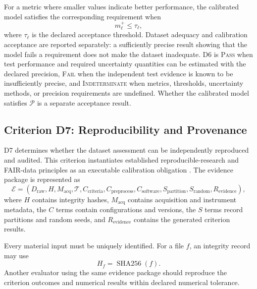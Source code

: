 \documentclass[11pt,a4paper]{article}
\begin{document}
For a metric where smaller values indicate better performance, the calibrated
model satisfies the corresponding requirement when
\begin{equation}
    m_\ell^{+}
    \leq
    \tau_\ell,
\end{equation}
where $\tau_\ell$ is the declared acceptance threshold. Dataset adequacy and
calibration acceptance are reported separately: a sufficiently precise result
showing that the model fails a requirement does not make the dataset
inadequate. D6 is \textsc{Pass} when test performance and required uncertainty
quantities can be estimated with the declared precision, \textsc{Fail} when
the independent test evidence is known to be insufficiently precise, and
\textsc{Indeterminate} when metrics, thresholds, uncertainty methods, or
precision requirements are undefined. Whether the calibrated model satisfies
$\mathcal{P}$ is a separate acceptance result.

\subsection{Criterion D7: Reproducibility and Provenance}

D7 determines whether the dataset assessment can be independently reproduced
and audited. This criterion instantiates established reproducible-research and
FAIR-data principles as an executable calibration obligation
\cite{sandve2013,wilkinson2016}. The evidence package is represented as
\begin{equation}
    \mathcal{E}
    =
    \left(
        D_{\mathrm{raw}},
        H,
        M_{\mathrm{acq}},
        \mathcal{T},
        C_{\mathrm{criteria}},
        C_{\mathrm{preprocess}},
        C_{\mathrm{software}},
        S_{\mathrm{partition}},
        S_{\mathrm{random}},
        R_{\mathrm{evidence}}
    \right),
\end{equation}
where $H$ contains integrity hashes, $M_{\mathrm{acq}}$ contains acquisition
and instrument metadata, the $C$ terms contain configurations and versions,
the $S$ terms record partitions and random seeds, and
$R_{\mathrm{evidence}}$ contains the generated criterion results.

Every material input must be uniquely identified. For a file $f$, an integrity
record may use
\begin{equation}
    H_f
    =
    \operatorname{SHA256}(f).
\end{equation}
Another evaluator using the same evidence package should reproduce the
criterion outcomes and numerical results within declared numerical tolerance.
\end{document}
